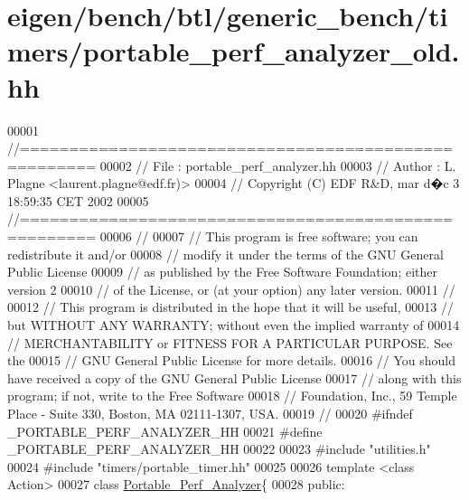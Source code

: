 \hypertarget{eigen_2bench_2btl_2generic__bench_2timers_2portable__perf__analyzer__old_8hh_source}{}\section{eigen/bench/btl/generic\+\_\+bench/timers/portable\+\_\+perf\+\_\+analyzer\+\_\+old.hh}
\label{eigen_2bench_2btl_2generic__bench_2timers_2portable__perf__analyzer__old_8hh_source}

\begin{DoxyCode}
00001 \textcolor{comment}{//=====================================================}
00002 \textcolor{comment}{// File   :  portable\_perf\_analyzer.hh}
00003 \textcolor{comment}{// Author :  L. Plagne <laurent.plagne@edf.fr)>}
00004 \textcolor{comment}{// Copyright (C) EDF R&D,  mar d�c 3 18:59:35 CET 2002}
00005 \textcolor{comment}{//=====================================================}
00006 \textcolor{comment}{//}
00007 \textcolor{comment}{// This program is free software; you can redistribute it and/or}
00008 \textcolor{comment}{// modify it under the terms of the GNU General Public License}
00009 \textcolor{comment}{// as published by the Free Software Foundation; either version 2}
00010 \textcolor{comment}{// of the License, or (at your option) any later version.}
00011 \textcolor{comment}{//}
00012 \textcolor{comment}{// This program is distributed in the hope that it will be useful,}
00013 \textcolor{comment}{// but WITHOUT ANY WARRANTY; without even the implied warranty of}
00014 \textcolor{comment}{// MERCHANTABILITY or FITNESS FOR A PARTICULAR PURPOSE.  See the}
00015 \textcolor{comment}{// GNU General Public License for more details.}
00016 \textcolor{comment}{// You should have received a copy of the GNU General Public License}
00017 \textcolor{comment}{// along with this program; if not, write to the Free Software}
00018 \textcolor{comment}{// Foundation, Inc., 59 Temple Place - Suite 330, Boston, MA  02111-1307, USA.}
00019 \textcolor{comment}{//}
00020 \textcolor{preprocessor}{#ifndef \_PORTABLE\_PERF\_ANALYZER\_HH}
00021 \textcolor{preprocessor}{#define \_PORTABLE\_PERF\_ANALYZER\_HH}
00022 
00023 \textcolor{preprocessor}{#include "utilities.h"}
00024 \textcolor{preprocessor}{#include "timers/portable\_timer.hh"}
00025 
00026 \textcolor{keyword}{template} <\textcolor{keyword}{class} Action>
00027 \textcolor{keyword}{class }\hyperlink{class_portable___perf___analyzer}{Portable\_Perf\_Analyzer}\{
00028 \textcolor{keyword}{public}:

\end{DoxyCode}
